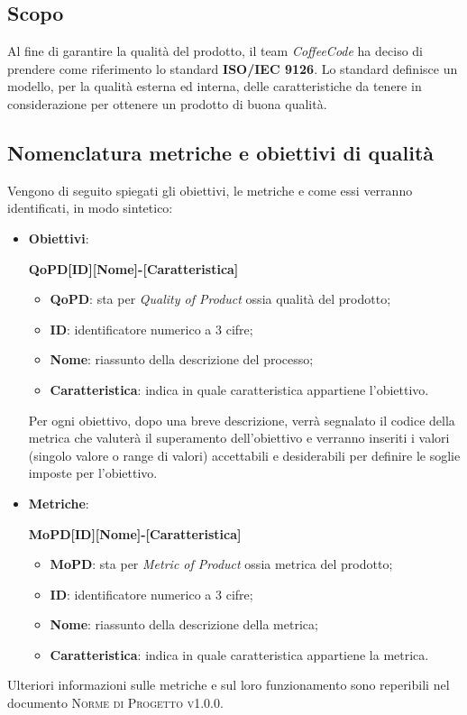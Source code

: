 \documentclass[../piano-di-qualifica.tex]{subfiles}
\begin{document}
\subsection{Scopo}%
\label{sec:scopo}
Al fine di garantire la qualità del prodotto, il team \emph{CoffeeCode} ha deciso di prendere come riferimento lo standard \textbf{ISO/IEC 9126}.
Lo standard definisce un modello, per la qualità esterna ed interna, delle caratteristiche da tenere in considerazione per ottenere un prodotto di buona qualità.

\subsection{Nomenclatura metriche e obiettivi di qualità}%
\label{sub:nomenclatura_metriche_e_obiettivi_di_qualita}
Vengono di seguito spiegati gli obiettivi, le metriche e come essi verranno identificati, in modo sintetico:
\begin{itemize}
    \item \textbf{Obiettivi}: 
    \begin{center}
        \centering
        \textbf{QoPD[ID][Nome]-[Caratteristica]}%
    \end{center} 
        \begin{itemize}
            \item \textbf{QoPD}: sta per \textit{Quality of Product} ossia qualità del prodotto;
            \item \textbf{ID}: identificatore numerico a 3 cifre;
            \item \textbf{Nome}: riassunto della descrizione del processo;
            \item \textbf{Caratteristica}: indica in quale caratteristica appartiene l'obiettivo.
        \end{itemize}
        Per ogni obiettivo, dopo una breve descrizione, verrà segnalato il codice della metrica che valuterà il superamento dell'obiettivo e verranno inseriti i valori (singolo valore o range di valori) accettabili e desiderabili per definire le soglie imposte per l'obiettivo.
    \item \textbf{Metriche}: 
    \begin{center}
        \centering
        \textbf{MoPD[ID][Nome]-[Caratteristica]}%
    \end{center} 
        \begin{itemize}
            \item \textbf{MoPD}: sta per \textit{Metric of Product} ossia metrica del prodotto;
            \item \textbf{ID}: identificatore numerico a 3 cifre;
            \item \textbf{Nome}: riassunto della descrizione della metrica;
            \item \textbf{Caratteristica}: indica in quale caratteristica appartiene la metrica.
        \end{itemize}
\end{itemize}  
Ulteriori informazioni sulle metriche e sul loro funzionamento sono reperibili nel documento \textsc{Norme di Progetto v1.0.0}.
\end{document}
